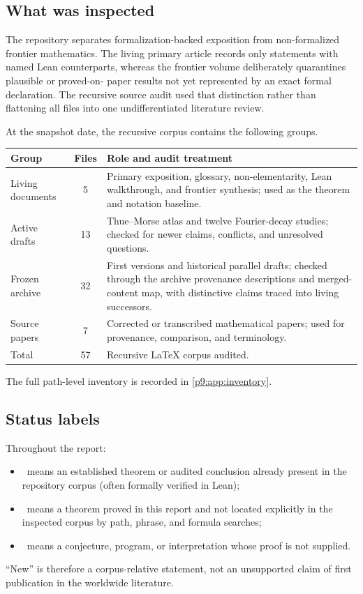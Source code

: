 \documentclass[11pt]{article}
\numberwithin{equation}{section}
\theoremstyle{definition}
\theoremstyle{remark}
\begin{document}
\subsection{What was inspected}
The repository separates formalization-backed exposition from non-formalized frontier
mathematics.  The living primary article records only statements with named Lean
counterparts, whereas the frontier volume deliberately quarantines plausible or proved-on-
paper results not yet represented by an exact formal declaration.  The recursive source
audit used that distinction rather than flattening all files into one undifferentiated
literature review.

At the snapshot date, the recursive corpus contains the following groups.
\begin{center}
\small
\begin{tabularx}{\textwidth}{@{}l c >{\raggedright\arraybackslash}X@{}}
\toprule
Group & Files & Role and audit treatment\\
\midrule
Living documents & 5 & Primary exposition, glossary, non-elementarity, Lean walkthrough,
and frontier synthesis; used as the theorem and notation baseline.\\
Active drafts & 13 & Thue--Morse atlas and twelve Fourier-decay studies; checked for
newer claims, conflicts, and unresolved questions.\\
Frozen archive & 32 & First versions and historical parallel drafts; checked through the
archive provenance descriptions and merged-content map, with distinctive claims traced into
living successors.\\
Source papers & 7 & Corrected or transcribed mathematical papers; used for provenance,
comparison, and terminology.\\
\midrule
Total & 57 & Recursive LaTeX corpus audited.\\
\bottomrule
\end{tabularx}
\end{center}
The full path-level inventory is recorded in \cref{p9:app:inventory}.

\subsection{Status labels}
Throughout the report:
\begin{itemize}
\item \statusE\ means an established theorem or audited conclusion already present in the
repository corpus (often formally verified in Lean);
\item \statusN\ means a theorem proved in this report and not located explicitly in the
inspected corpus by path, phrase, and formula searches;
\item \statusC\ means a conjecture, program, or interpretation whose proof is not supplied.
\end{itemize}
``New'' is therefore a corpus-relative statement, not an unsupported claim of first
publication in the worldwide literature.
\end{document}
